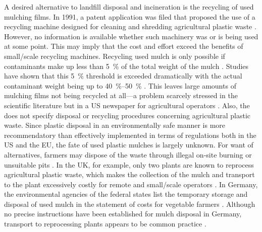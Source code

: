 A desired alternative to landfill disposal and incineration is the recycling of used mulching films. In 1991, a patent application was filed that proposed the use of a recycling machine designed for cleaning and shredding agricultural plastic waste \citep{VacchelliAnlage1992}. However, no information is available whether such machinery was or is being used at some point. This may imply that the cost and effort exceed the benefits of small\-/scale recycling machines. Recycling used mulch is only possible if contaminants make up less than \SI{5}{\percent} of the total weight of the mulch \citep{ClarkeRecycling1996}. Studies have shown that this \SI{5}{\percent} threshold is exceeded dramatically with the actual contaminant weight being up to \SIrange{40}{50}{\percent} \citep{HussainPlastics2003, LevitanRecycling2003,NerinAssessing1999}. This leaves large amounts of mulching films not being recycled at all---a problem scarcely stressed in the scientific literature but in a US newspaper for agricultural operators \citep{KotrbaWhat2008}.
Also, the \citet{EUWasteFrameworkDirectiveDirective2008} does not specify disposal or recycling procedures concerning agricultural plastic waste. Since plastic disposal in an environmentally safe manner is more recommendatory than effectively implemented in terms of regulations both in the US and the EU, the fate of used plastic mulches is largely unknown.
For want of alternatives, farmers may dispose of the waste through illegal on-site burning or unsuitable pits \citep{HemphillAgricultural1993, Scarascia-MugnozzaPlastic2011}. In the UK, for example, only two
plants are known to reprocess agricultural plastic waste, which makes the collection of the mulch and transport to the plant excessively costly for remote and small\-/scale operators \citep{ScottishExecutiveEnvironmentGroupCode2006}. In Germany, the environmental agencies of the federal states list the temporary storage and disposal of used mulch in the statement of costs for vegetable farmers \citep{BayerischeLandesanstaltfurLandwirtschaftFeldgemuseanbau2005}. Although no precise instructions have been established for mulch disposal in Germany, transport to reprocessing plants appears to be common practice \citep{StraeterAlles2011}.

